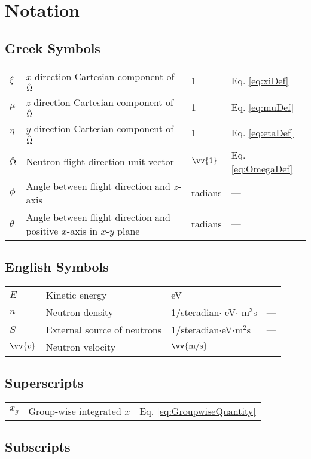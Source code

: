 \section{Notation}

\subsection{Greek Symbols}

\begin{tabular}{l l l l}
\(\xi\) & \(x\)-direction Cartesian component of \(\hat{\Omega}\) & 1 & Eq. \eqref{eq:xiDef}\\
\(\mu\) & \(z\)-direction Cartesian component of \(\hat{\Omega}\) & 1 & Eq. \eqref{eq:muDef}\\
\(\eta\) & \(y\)-direction Cartesian component of \(\hat{\Omega}\) & 1 & Eq. \eqref{eq:etaDef}\\
\(\hat{\Omega}\) & Neutron flight direction unit vector & \(\vv{1}\) & Eq. \eqref{eq:OmegaDef}\\
\(\phi\) & Angle between flight direction and \(z\)-axis & radians & ---\\
\(\theta\) & Angle between flight direction and positive \(x\)-axis in \(x\)-\(y\) plane & radians & ---\\
\end{tabular}

\subsection{English Symbols}

\begin{tabular}{l l l l}
\(E\) & Kinetic energy & eV & ---\\
\(n\) & Neutron density & 1/steradian\(\cdot\) eV\(\cdot\) m$^3$s & ---\\
\(S\) & External source of neutrons & 1/steradian\(\cdot\)eV\(\cdot\)m$^2$s & ---\\
\(\vv{v}\) & Neutron velocity & \(\vv{\text{m/s}}\) & ---\\
\end{tabular}

\subsection{Superscripts}

\begin{tabular}{l l l}
\(x_g\) & Group-wise integrated \(x\) & Eq. \eqref{eq:GroupwiseQuantity}\\
\end{tabular}

\subsection{Subscripts}
